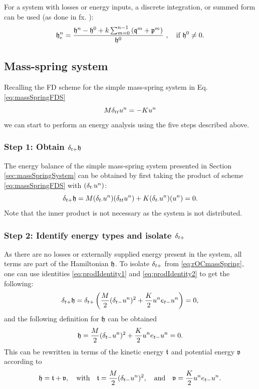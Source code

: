 {{For a system with losses or energy inputs, a discrete integration, or summed form can be used (as done in fx. \cite{Harrison2018}):
\begin{equation}\label{eq:normalisedEnergyDamping}
    \h_{\text{e}}^n = \frac{\h^n-\h^0 + k\sum_{m = 0}^{n-1} \left(\mathfrak{q}^m + \mathfrak{p}^m\right)}{\h^0}\ ,\quad \text{if}\ \h^0\neq 0.
\end{equation}

\subsection{Mass-spring system}
Recalling the FD scheme for the simple mass-spring system in Eq. \eqref{eq:massSpringFDS}
\begin{equation*}
    M\delta_{tt} u^n = -Ku^n
\end{equation*}
we can start to perform an energy analysis using the five steps described above. 

\subsubsection{Step 1: Obtain $\delta_{t+} \mathfrak{h}$}
The energy balance of the simple mass-spring system presented in Section \ref{sec:massSpringSystem} can be obtained by first taking the product of scheme \eqref{eq:massSpringFDS} with $(\delta_{t\cdot} u^n)$:
\begin{equation}\label{eq:rOCmassSpring}
    \delta_{t+} \mathfrak{h} = M(\delta_{t\cdot}u^n)(\delta_{tt} u^n) + K(\delta_{t\cdot}u^n)(u^n) = 0.
\end{equation}
Note that the inner product is not necessary as the system is not distributed.

\subsubsection{Step 2: Identify energy types and isolate $\delta_{t+}$}
As there are no losses or externally supplied energy present in the system, all terms are part of the Hamiltonian $\mathfrak{h}$. To isolate $\delta_{t+}$ from \eqref{eq:rOCmassSpring}, one can use identities \eqref{eq:prodIdentity1} and \eqref{eq:prodIdentity2} to get the following:
\begin{equation}
    \delta_{t+} \mathfrak{h} = \delta_{t+}\left(\frac{M}{2}(\delta_{t-}u^n)^2 + \frac{K}{2}u^n e_{t-}u^n\right) = 0,
\end{equation}
and the following definition for $\mathfrak{h}$ can be obtained
\begin{equation}
    \mathfrak{h} = \frac{M}{2}(\delta_{t-}u^n)^2 + \frac{K}{2}u^n e_{t-}u^n = 0.
\end{equation}
This can be rewritten in terms of the kinetic energy $\mathfrak{t}$ and potential energy $\mathfrak{v}$ according to
\begin{equation}\label{eq:energyBalanceMassSpring}
    \mathfrak{h} = \mathfrak{t} + \mathfrak{v}, \quad \text{with} \quad
    \mathfrak{t} = \frac{M}{2}(\delta_{t-}u^n)^2, \quad \text{and} \quad \mathfrak{v} = \frac{K}{2}u^n e_{t-}u^n.
\end{equation} 

}}

